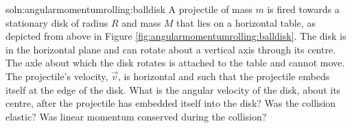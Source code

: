 \begin{problem}{soln:angularmomentumrolling:balldisk}{\label{prob:angularmomentumrolling:balldisk}
A projectile of mass $m$ is fired towards a stationary disk of radius $R$ and mass $M$ that lies on a horizontal table, as depicted from above in Figure \ref{fig:angularmomentumrolling:balldisk}. The disk is in the horizontal plane and can rotate about a vertical axis through its centre. The axle about which the disk rotates is attached to the table and cannot move. The projectile's velocity, $\vec v$, is horizontal and such that the projectile embeds itself at the edge of the disk.  What is the angular velocity of the disk, about its centre, after the projectile has embedded itself into the disk? Was the collision elastic? Was linear momentum conserved during the collision?}
\end{problem}

\newpage
